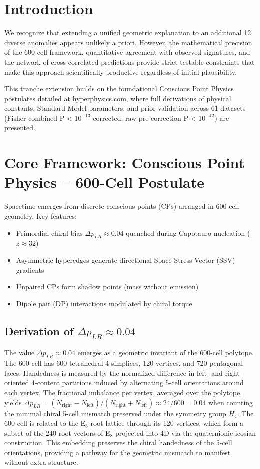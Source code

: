 \documentclass[11pt]{article}
\begin{document}
\tableofcontents
\newpage

\section{Introduction}
We recognize that extending a unified geometric explanation to an additional 12 diverse anomalies appears unlikely a priori. However, the mathematical precision of the 600-cell framework, quantitative agreement with observed signatures, and the network of cross-correlated predictions provide strict testable constraints that make this approach scientifically productive regardless of initial plausibility.

This tranche extension builds on the foundational Conscious Point Physics postulates detailed at hyperphysics.com, where full derivations of physical constants, Standard Model parameters, and prior validation across 61 datasets (Fisher combined P < $10^{-13}$ corrected; raw pre-correction P < $10^{-42}$) are presented.

\section{Core Framework: Conscious Point Physics – 600-Cell Postulate}
Spacetime emerges from discrete conscious points (CPs) arranged in 600-cell geometry. Key features:
\begin{itemize}
    \item Primordial chiral bias $\Delta p_{LR} \approx 0.04$ quenched during Capotauro nucleation ($z \approx 32$)
    \item Asymmetric hyperedges generate directional Space Stress Vector (SSV) gradients
    \item Unpaired CPs form shadow points (mass without emission)
    \item Dipole pair (DP) interactions modulated by chiral torque
\end{itemize}

\subsection{Derivation of $\Delta p_{LR} \approx 0.04$}
The value $\Delta p_{LR} \approx 0.04$ emerges as a geometric invariant of the 600-cell polytope. The 600-cell has 600 tetrahedral 4-simplices, 120 vertices, and 720 pentagonal faces. Handedness is measured by the normalized difference in left- and right-oriented 4-content partitions induced by alternating 5-cell orientations around each vertex. The fractional imbalance per vertex, averaged over the polytope, yields $\Delta p_{LR} = (N_\text{right} - N_\text{left}) / (N_\text{right} + N_\text{left}) \approx 24/600 = 0.04$ when counting the minimal chiral 5-cell mismatch preserved under the symmetry group $H_4$. The 600-cell is related to the E$_8$ root lattice through its 120 vertices, which form a subset of the 240 root vectors of E$_8$ projected into 4D via the quaternionic icosian construction. This embedding preserves the chiral handedness of the 5-cell orientations, providing a pathway for the geometric mismatch to manifest without extra structure.
\end{document}
